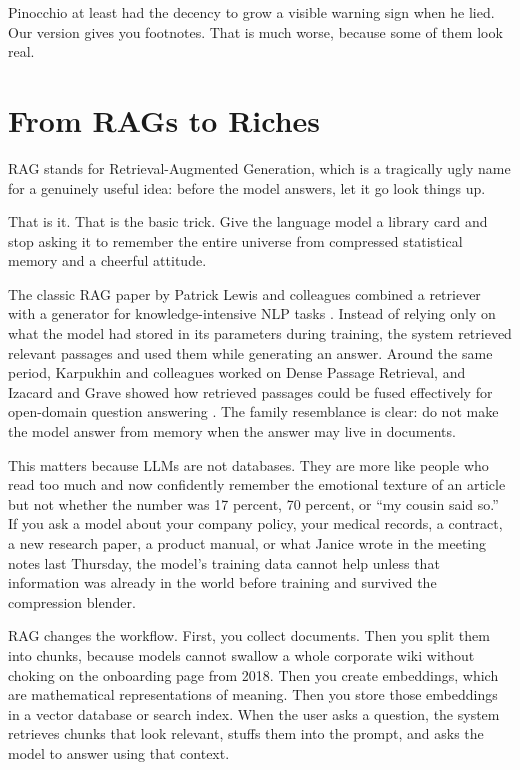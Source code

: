 \documentclass[12pt,oneside]{book}
\begin{document}
Pinocchio at least had the decency to grow a visible warning sign when he lied. Our version gives you footnotes. That is much worse, because some of them look real.

\chapter{From RAGs to Riches}

RAG stands for Retrieval-Augmented Generation, which is a tragically ugly name for a genuinely useful idea: before the model answers, let it go look things up.

That is it. That is the basic trick. Give the language model a library card and stop asking it to remember the entire universe from compressed statistical memory and a cheerful attitude.

The classic RAG paper by Patrick Lewis and colleagues combined a retriever with a generator for knowledge-intensive NLP tasks \parencite{lewis2020}. Instead of relying only on what the model had stored in its parameters during training, the system retrieved relevant passages and used them while generating an answer. Around the same period, Karpukhin and colleagues worked on Dense Passage Retrieval, and Izacard and Grave showed how retrieved passages could be fused effectively for open-domain question answering \parencite{karpukhin2020,izacard2021}. The family resemblance is clear: do not make the model answer from memory when the answer may live in documents.

This matters because LLMs are not databases. They are more like people who read too much and now confidently remember the emotional texture of an article but not whether the number was 17 percent, 70 percent, or ``my cousin said so.'' If you ask a model about your company policy, your medical records, a contract, a new research paper, a product manual, or what Janice wrote in the meeting notes last Thursday, the model's training data cannot help unless that information was already in the world before training and survived the compression blender.

RAG changes the workflow. First, you collect documents. Then you split them into chunks, because models cannot swallow a whole corporate wiki without choking on the onboarding page from 2018. Then you create embeddings, which are mathematical representations of meaning. Then you store those embeddings in a vector database or search index. When the user asks a question, the system retrieves chunks that look relevant, stuffs them into the prompt, and asks the model to answer using that context.
\end{document}
